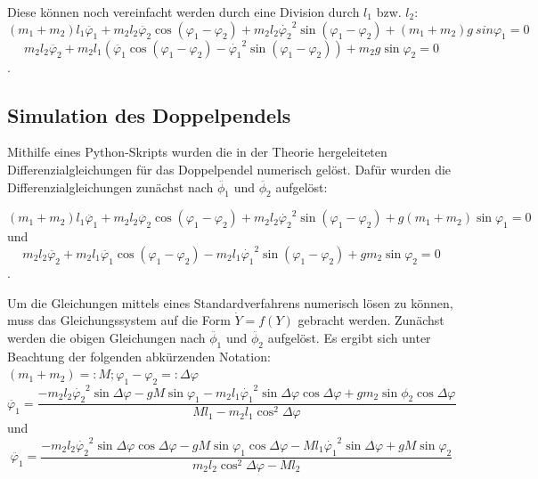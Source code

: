 Diese können noch vereinfacht werden durch eine Division durch $l_1$ bzw. $l_2$: 
\begin{equation}
(m_1 + m_2) l_1\ddot{\varphi_1} + m_2 l_2 \ddot{\varphi_2} \cos (\varphi_1 - \varphi_2) + m_2 l_2 \dot{\varphi_2}^2 \sin (\varphi_1 - \varphi_2) + (m_1 + m_2) g \ sin \varphi_1 = 0
\end{equation}
\begin{equation}
m_2 l_2 \ddot{\varphi_2} + m_2 l_1 (\ddot{\varphi_1} \cos (\varphi_1 - \varphi_2) - \dot{\varphi_1}^2 \sin (\varphi_1 - \varphi_2)) + m_2 g \sin \varphi_2 = 0
\end{equation}
. 
\subsection{Simulation des Doppelpendels}
Mithilfe eines Python-Skripts wurden die in der Theorie hergeleiteten Differenzialgleichungen für das Doppelpendel numerisch gelöst. Dafür wurden die Differenzialgleichungen zunächst nach $ \ddot{\phi_1} $ und $\ddot{\phi_2} $ aufgelöst: 

\begin{equation}
(m_1 + m_2) l_1 \ddot{\varphi_1}  + m_2 l_2 \ddot{\varphi_2} \cos{(\varphi_1 - \varphi_2)} + m_2 l_2 \dot{\varphi_2}^{2} \sin{(\varphi_1 - \varphi_2)} + g (m_1 + m_2) \sin{\varphi_1} = 0
\end{equation} 
und
\begin{equation}
m_2 l_2 \ddot{\varphi_2} + m_2 l_1 \ddot{\varphi_1} \cos{(\varphi_1 - \varphi_2)} - m_2 l_1 \dot{\varphi_1}^{2} \sin{(\varphi_1 - \varphi_2)} + g m_2 \sin{\varphi_2} = 0
\end{equation}
. 

Um die Gleichungen mittels eines Standardverfahrens numerisch lösen zu können, muss das Gleichungssystem auf die Form $ \dot{Y} = f(Y) $ gebracht werden. Zunächst werden die obigen Gleichungen nach $ \ddot{\phi_1} $ und $ \ddot{\phi_2} $ aufgelöst. Es ergibt sich unter Beachtung der folgenden abkürzenden Notation: 
$ (m_1 + m_2) =: M; \varphi_1 - \varphi_2 =: \Delta \varphi $
\begin{equation}
\ddot{\varphi_1} = \frac{-m_2 l_2 \dot{\varphi_2}^{2} \sin{\Delta \varphi} - g M \sin{\varphi_1} - m_2 l_1 \dot{\varphi_1}^{2} \sin{\Delta \varphi} \cos{\Delta \varphi} + g m_2 \sin{\phi_2}\cos{\Delta  \varphi}}{M l_1 - m_2 l_1 \cos^{2}{\Delta \varphi}}
\end{equation}
und
\begin{equation} 
\ddot{\varphi_1} = \frac{-m_2 l_2 \dot{\varphi_2}^{2} \sin{\Delta \varphi} \cos{\Delta \varphi} - g M \sin{\varphi_1} \cos{\Delta \varphi} - M l_1 \dot{\varphi_1}^{2} \sin{\Delta \varphi} + g M \sin{\varphi_2}}{m_2 l_2 \cos^{2}{\Delta \varphi} - M l_2}
\end{equation}

